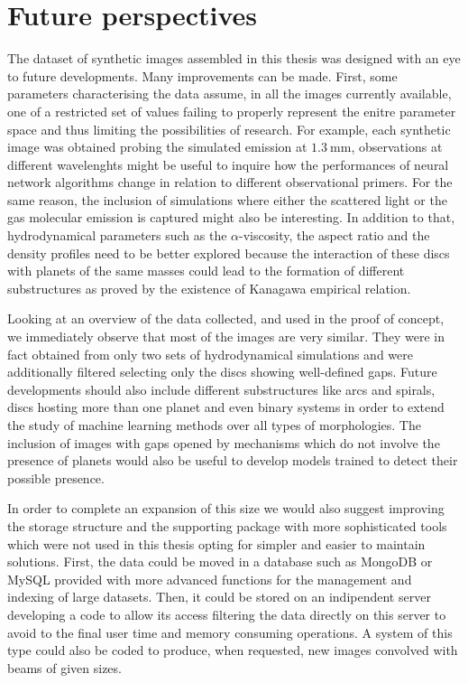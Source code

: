\documentclass[a4paper,10pt]{report}
\begin{document}
\section{Future perspectives}

The dataset of synthetic images assembled in this thesis was designed with an 
eye to future developments. Many improvements can be made. First, some parameters characterising the data
assume, in all the images currently available, one of a restricted set of values failing to properly represent 
the enitre parameter space and thus limiting the possibilities of research.
For example, each synthetic image was obtained probing the simulated emission at $\SI{1.3}{\mm}$,
observations at different wavelenghts might be useful to inquire how the
performances of neural network algorithms change in relation to different observational primers.
For the same reason, the inclusion of simulations where either the scattered light or the gas molecular
emission is captured might also be interesting. In addition to that, hydrodynamical parameters such as 
the $\alpha$-viscosity, the aspect ratio and the density profiles need to be better explored 
because the interaction of these discs with planets of the same masses
could lead to the formation of different substructures as proved by the existence of Kanagawa \cite{kanagawa}
empirical relation.

Looking at an overview of the data collected, and used in the proof of concept, we immediately observe that
most of the images are very similar. They were in fact obtained from only two sets of hydrodynamical simulations
and were additionally filtered selecting only the discs showing well-defined gaps. 
Future developments should also include different substructures like arcs and spirals, discs 
hosting more than one planet and even binary systems in order to extend the study of machine learning methods
over all types of morphologies. The inclusion of images with gaps opened by mechanisms which do not involve the presence of
planets would also be useful to develop models trained to detect their possible presence.

In order to complete an expansion of this size we would also suggest improving the storage structure
and the supporting package with more sophisticated tools which were not used in this thesis opting for
simpler and easier to maintain solutions. First, the data could be moved in a database such as MongoDB or MySQL
provided with more advanced functions for the management and indexing of large datasets.
Then, it could be stored on an indipendent server developing a code to allow its access filtering the data directly on 
this server to avoid to the final user time and memory consuming operations. A system of this type could also be coded to
produce, when requested, new images convolved with beams of given sizes.
\end{document}
